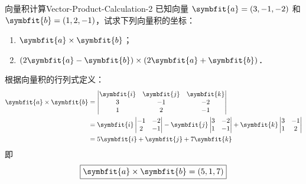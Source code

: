 \begin{problem}{向量积计算}{Vector-Product-Calculation-2}
    已知向量 $\symbfit{a} = (3, -1, -2)$ 和 $\symbfit{b} = (1, 2, -1)$，试求下列向量积的坐标：
    \begin{enumerate}
        \item $\symbfit{a} \times \symbfit{b}$；
        \item $(2\symbfit{a} - \symbfit{b}) \times (2\symbfit{a} + \symbfit{b})$．
    \end{enumerate}
\end{problem}

\begin{solution}

    根据向量积的行列式定义：
    \begin{equation}
        \begin{aligned}
            \symbfit{a} \times \symbfit{b} & = \begin{vmatrix} \symbfit{i} & \symbfit{j} & \symbfit{k} \\ 3 & -1 & -2 \\ 1 & 2 & -1 \end{vmatrix}                                                                                   \\
                                           & = \symbfit{i} \begin{vmatrix} -1 & -2 \\ 2 & -1 \end{vmatrix} - \symbfit{j} \begin{vmatrix} 3 & -2 \\ 1 & -1 \end{vmatrix} + \symbfit{k} \begin{vmatrix} 3 & -1 \\ 1 & 2 \end{vmatrix} \\
                                           & = 5\symbfit{i} + \symbfit{j} + 7\symbfit{k}
        \end{aligned}
    \end{equation}
    即
    \begin{equation}
        \boxed{\symbfit{a} \times \symbfit{b} = (5, 1, 7)}
    \end{equation}



\end{solution}
